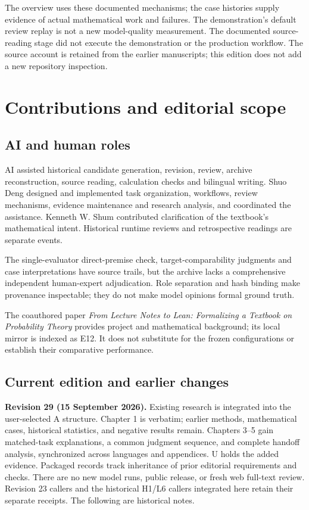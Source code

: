 The overview uses these documented mechanisms; the case histories supply evidence of actual mathematical work and failures. The demonstration's default review replay is not a new model-quality measurement. The documented source-reading stage did not execute the demonstration or the production workflow. The source account is retained from the earlier manuscripts; this edition does not add a new repository inspection.

\section[Contributions and editorial scope]{\texorpdfstring{\protect\hypertarget{appendix-f}{}Contributions and editorial scope}{Contributions and editorial scope}}
\subsection[AI and human roles]{\texorpdfstring{\protect\hypertarget{f1}{}AI and human roles}{AI and human roles}}
AI assisted historical candidate generation, revision, review, archive reconstruction, source reading, calculation checks and bilingual writing. Shuo Deng designed and implemented task organization, workflows, review mechanisms, evidence maintenance and research analysis, and coordinated the assistance. Kenneth W. Shum contributed clarification of the textbook's mathematical intent. Historical runtime reviews and retrospective readings are separate events.

The single-evaluator direct-premise check, target-comparability judgments and case interpretations have source trails, but the archive lacks a comprehensive independent human-expert adjudication. Role separation and hash binding make provenance inspectable; they do not make model opinions formal ground truth.

The coauthored paper \emph{From Lecture Notes to Lean: Formalizing a Textbook on Probability Theory} provides project and mathematical background; its local mirror is indexed as E12. It does not substitute for the frozen configurations or establish their comparative performance.

\subsection[Current edition and earlier changes]{\texorpdfstring{\protect\hypertarget{f2}{}Current edition and earlier changes}{Current edition and earlier changes}}
\textbf{Revision 29 (15 September 2026).} Existing research is integrated into the user-selected A structure. Chapter 1 is verbatim; earlier methods, mathematical cases, historical statistics, and negative results remain. Chapters 3–5 gain matched-task explanations, a common judgment sequence, and complete handoff analysis, synchronized across languages and appendices. U holds the added evidence. Packaged records track inheritance of prior editorial requirements and checks. There are no new model runs, public release, or fresh web full-text review. Revision 23 callers and the historical H1/L6 callers integrated here retain their separate receipts. The following are historical notes.

